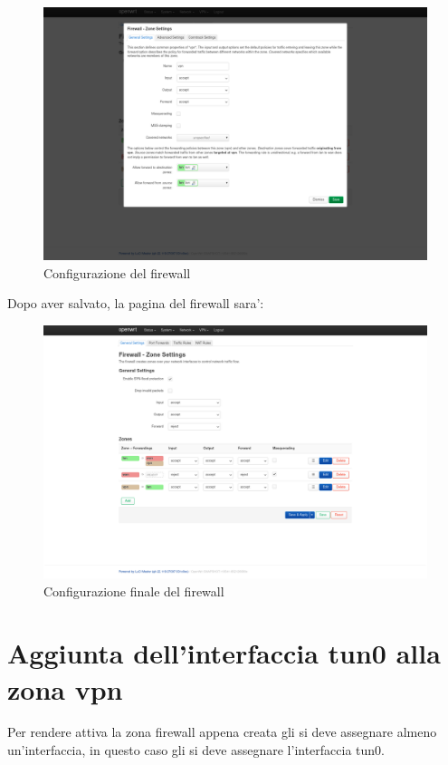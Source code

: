 \begin{figure}[H]
    \centering
    \includegraphics[width=0.9\linewidth]{immagini/LuCI_firewall_vpn}
    \caption{Configurazione del firewall}
    \label{fig:luci-firewall-vpn}
\end{figure}

Dopo aver salvato, la pagina del firewall sara':

\begin{figure}[H]
    \centering
    \includegraphics[width=0.9\linewidth]{immagini/LuCI_firewall_end}
    \caption{Configurazione finale del firewall}
    \label{fig:luci-firewall-end}
\end{figure}

\section{Aggiunta dell'interfaccia tun0 alla zona vpn}

Per rendere attiva la zona firewall appena creata gli si deve assegnare almeno un'interfaccia, in questo caso gli si deve assegnare l'interfaccia tun0.


